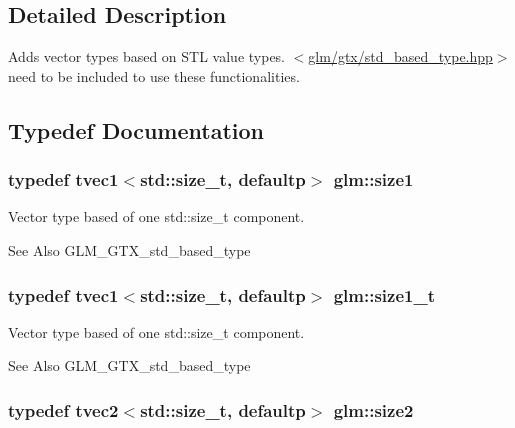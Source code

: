 \subsection{Detailed Description}
Adds vector types based on S\-T\-L value types. $<$\hyperlink{std__based__type_8hpp}{glm/gtx/std\-\_\-based\-\_\-type.\-hpp}$>$ need to be included to use these functionalities. 

\subsection{Typedef Documentation}
\hypertarget{group__gtx__std__based__type_ga3550330d27cef40f7694130b501be73a}{
\subsubsection[{size1}]{\setlength{\rightskip}{0pt plus 5cm}typedef tvec1$<$std\-::size\-\_\-t, defaultp$>$ {\bf glm\-::size1}}}\label{group__gtx__std__based__type_ga3550330d27cef40f7694130b501be73a}
Vector type based of one std\-::size\-\_\-t component. \begin{DoxySeeAlso}{See Also}
G\-L\-M\-\_\-\-G\-T\-X\-\_\-std\-\_\-based\-\_\-type 
\end{DoxySeeAlso}
\hypertarget{group__gtx__std__based__type_ga9a9525491009d0df7bcc964b1e2e5745}{
\subsubsection[{size1\-\_\-t}]{\setlength{\rightskip}{0pt plus 5cm}typedef tvec1$<$std\-::size\-\_\-t, defaultp$>$ {\bf glm\-::size1\-\_\-t}}}\label{group__gtx__std__based__type_ga9a9525491009d0df7bcc964b1e2e5745}
Vector type based of one std\-::size\-\_\-t component. \begin{DoxySeeAlso}{See Also}
G\-L\-M\-\_\-\-G\-T\-X\-\_\-std\-\_\-based\-\_\-type 
\end{DoxySeeAlso}
\hypertarget{group__gtx__std__based__type_gab8b434ee2ba109726915e977c6aca22a}{
\subsubsection[{size2}]{\setlength{\rightskip}{0pt plus 5cm}typedef tvec2$<$std\-::size\-\_\-t, defaultp$>$ {\bf glm\-::size2}}}\label{group__gtx__std__based__type_gab8b434ee2ba109726915e977c6aca22a}
